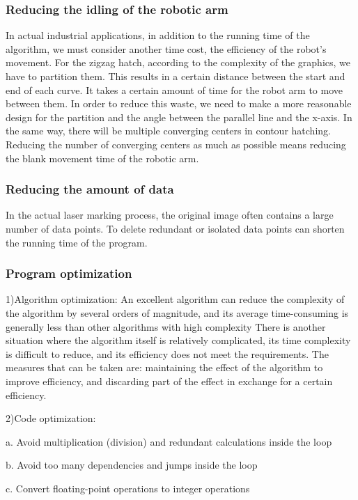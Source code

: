 \documentclass{apmcmthesis}
\begin{document}
\subsubsection{Reducing the idling of the robotic arm}
In actual industrial applications, in addition to the running time of the algorithm, we must consider another time cost, the efficiency of the robot's movement. For the zigzag hatch, according to the complexity of the graphics, we have to partition them. This results in a certain distance between the start and end of each curve. It takes a certain amount of time for the robot arm to move between them. In order to reduce this waste, we need to make a more reasonable design for the partition and the angle between the parallel line and the x-axis. In the same way, there will be multiple converging centers in contour hatching. Reducing the number of converging centers as much as possible means reducing the blank movement time of the robotic arm.

\subsubsection{Reducing the amount of data}
In the actual laser marking process, the original image often contains a large number of data points. To delete redundant or isolated data points can shorten the running time of the program.
\subsubsection{Program optimization\cite{1}}

1)Algorithm optimization:
An excellent algorithm can reduce the complexity of the algorithm by several orders of magnitude, and its average time-consuming is generally less than other algorithms with high complexity
There is another situation where the algorithm itself is relatively complicated, its time complexity is difficult to reduce, and its efficiency does not meet the requirements. The measures that can be taken are: maintaining the effect of the algorithm to improve efficiency, and discarding part of the effect in exchange for a certain efficiency.


2)Code optimization:


a. Avoid multiplication (division) and redundant calculations inside the loop


b. Avoid too many dependencies and jumps inside the loop


c. Convert floating-point operations to integer operations
\end{document}
